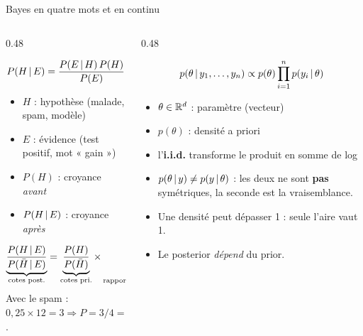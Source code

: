 \begin{frame}{Bayes en quatre mots et en continu}
\small
\begin{columns}[t]
\begin{column}{0.48\textwidth}
\begin{kbox}
\[
P(H \,\vert\, E) = \frac{P(E \,\vert\, H)\,P(H)}{P(E)}
\]
\begin{itemize}
  \item $H$ : hypothèse (malade, spam, modèle)
  \item $E$ : évidence (test positif, mot « gain »)
  \item $P(H)$ : croyance \emph{avant}
  \item $P(H \,\vert\, E)$ : croyance \emph{après}
\end{itemize}
\end{kbox}
\begin{ebox}
\[
\underbrace{\frac{P(H \,\vert\, E)}{P(\bar H \,\vert\, E)}}_{\text{cotes post.}}
=
\underbrace{\frac{P(H)}{P(\bar H)}}_{\text{cotes pri.}}
\times
\underbrace{\frac{P(E \,\vert\, H)}{P(E \,\vert\, \bar H)}}_{\text{rapport de vraisemblance}}
\]
Avec le spam : $0{,}25 \times 12 = 3 \Rightarrow P = 3/4 = 0{,}75$.
\end{ebox}
\end{column}
\begin{column}{0.48\textwidth}
\begin{ebox}
\[
p(\theta \,\vert\, y_1, \dots, y_n) \propto p(\theta)\prod_{i=1}^{n} p(y_i \,\vert\, \theta)
\]
\begin{itemize}
  \item $\theta \in \mathbb{R}^d$ : paramètre (vecteur)
  \item $p(\theta)$ : densité a priori
  \item l'\textbf{i.i.d.} transforme le produit en somme de log
\end{itemize}
\end{ebox}
\begin{wbox}
\begin{itemize}
  \item $p(\theta \,\vert\, y) \neq p(y \,\vert\, \theta)$ : les deux ne sont
        \textbf{pas} symétriques, la seconde est la vraisemblance.
  \item Une densité peut dépasser 1 : seule l'aire vaut 1.
  \item Le posterior \emph{dépend} du prior.
\end{itemize}
\end{wbox}
\end{column}
\end{columns}
\end{frame}


